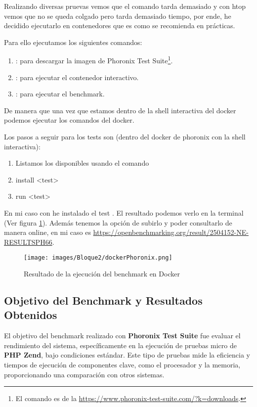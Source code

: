 Realizando diversas pruevas vemos que el comando tarda demasiado y con htop vemos que no se queda colgado pero tarda demasiado tiempo, por ende, he decidido ejecutarlo en contenedores que es como se recomienda en prácticas. 


Para ello ejecutamos los siguientes comandos:

\begin{enumerate}
    \item {}: para descargar la imagen de Phoronix Test Suite\footnote{El comando es de la \url{https://www.phoronix-test-suite.com/?k=downloads}.}.
    \item {}: para ejecutar el contenedor interactivo.
    \item {}: para ejecutar el benchmark.
\end{enumerate}

De manera que una vez que estamos dentro de la shell interactiva del docker podemos ejecutar los comandos del docker.

Los pasos a seguir para los tests son (dentro del docker de phoronix con la shell interactiva):
\begin{enumerate}
    \item Listamos los disponibles usando el comando 
    \item install <test>
    \item run <test>
\end{enumerate}

En mi caso con he instalado el test . El resultado podemos verlo en la terminal (Ver figura \ref{fig:dockerPhoronix}). Además tenemos la opción de subirlo y poder consultarlo de manera online, en mi caso es \url{https://openbenchmarking.org/result/2504152-NE-RESULTSPH66}.

\begin{figure}[H]
    \centering
    \texttt{[image: images/Bloque2/dockerPhoronix.png]}
    \caption{Resultado de la ejecución del benchmark en Docker}
    \label{fig:dockerPhoronix}
\end{figure}

\subsection*{Objetivo del Benchmark y Resultados Obtenidos}

El objetivo del benchmark realizado con \textbf{Phoronix Test Suite} fue evaluar el rendimiento del sistema, específicamente en la ejecución de pruebas micro de \textbf{PHP Zend}, bajo condiciones estándar. Este tipo de pruebas mide la eficiencia y tiempos de ejecución de componentes clave, como el procesador y la memoria, proporcionando una comparación con otros sistemas.

